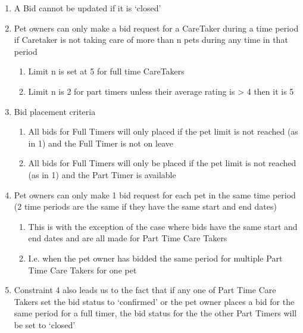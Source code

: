 \documentclass[
  paper=a4,
  ,captions=tableheading
]{scrartcl}
\providecommand{\tightlist}{%
  \setlength{\itemsep}{0pt}\setlength{\parskip}{0pt}}
\begin{document}
\begin{enumerate}
\def\labelenumi{\arabic{enumi}.}
\setcounter{enumi}{4}
\tightlist
\item
  A Bid cannot be updated if it is `closed'
\item
  Pet owners can only make a bid request for a CareTaker during a time
  period if Caretaker is not taking care of more than n pets during any
  time in that period

  \begin{enumerate}
  \def\labelenumii{\arabic{enumii}.}
  \tightlist
  \item
    Limit n is set at 5 for full time CareTakers
  \item
    Limit n is 2 for part timers unless their average rating is
    \textgreater{} 4 then it is 5
  \end{enumerate}
\item
  Bid placement criteria

  \begin{enumerate}
  \def\labelenumii{\arabic{enumii}.}
  \tightlist
  \item
    All bids for Full Timers will only placed if the pet limit is not
    reached (as in 1) and the Full Timer is not on leave
  \item
    All bids for Full Timers will only be placed if the pet limit is not
    reached (as in 1) and the Part Timer is available
  \end{enumerate}
\item
  Pet owners can only make 1 bid request for each pet in the same time
  period (2 time periods are the same if they have the same start and
  end dates)

  \begin{enumerate}
  \def\labelenumii{\arabic{enumii}.}
  \tightlist
  \item
    This is with the exception of the case where bids have the same
    start and end dates and are all made for Part Time Care Takers
  \item
    I.e. when the pet owner has bidded the same period for multiple Part
    Time Care Takers for one pet
  \end{enumerate}
\item
  Constraint 4 also leads us to the fact that if any one of Part Time
  Care Takers set the bid status to `confirmed' or the pet owner places
  a bid for the same period for a full timer, the bid status for the the
  other Part Timers will be set to `closed'
\end{enumerate}
\end{document}
